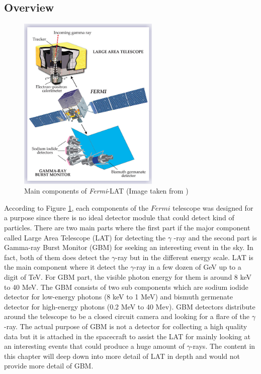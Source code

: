 \subsection{Overview}

\begin{figure}[h]
    \centering
    \includegraphics[width=0.6\textwidth]{content/background/figures/fermi_instrument.jpeg}
    \caption{Main components of \textit{Fermi}-LAT (Image taken from \cite{fermi_lat_instrument_first_year})}
    \label{fig:fermi_main_components}
\end{figure}
According to Figure \ref{fig:fermi_main_components},
each components of the $Fermi$ telescope was designed for a purpose since there 
is no ideal detector module that could detect kind of particles.
There are two main parts where the first part if the major component 
called Large Area Telescope (LAT) for detecting the $\gamma$
-ray and the second part is Gamma-ray Burst Monitor (GBM) for seeking 
an interesting event in the sky. In fact, both of them does detect 
the $\gamma$-ray but in the different energy scale. LAT is the main 
component where it detect the $\gamma$-ray in a few dozen of GeV 
up to a digit of TeV. For GBM part, the visible photon energy 
for them is around 8 keV to 40 MeV. The GBM consists of two 
sub components which are sodium iodide detector for low-energy photons
(8 keV to 1 MeV) and bismuth germenate detector for high-energy photons 
(0.2 MeV to 40 Mev). GBM detectors distribute around 
the telescope to be a closed circuit camera and looking for a flare 
of the $\gamma$-ray. The actual purpose of GBM is not a detector 
for collecting a high quality data but it is attached in the spacecraft 
to assist the LAT for mainly looking at an interesting events that could 
produce a huge amount of $\gamma$-rays. The content in this chapter 
will deep down into more detail of LAT in depth and would not provide 
more detail of GBM.

